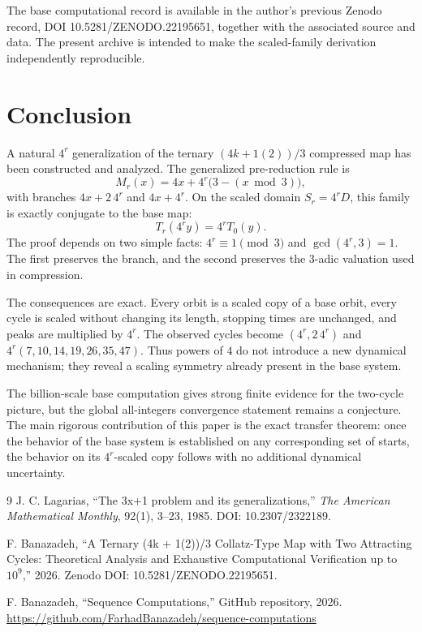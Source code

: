 \documentclass[11pt]{article}
\begin{document}
The base computational record is available in the author's previous Zenodo record, DOI 10.5281/ZENODO.22195651, together with the associated source and data. The present archive is intended to make the scaled-family derivation independently reproducible.

\section{Conclusion}
A natural $4^r$ generalization of the ternary $(4k+1(2))/3$ compressed map has been constructed and analyzed. The generalized pre-reduction rule is
\[
M_r(x)=4x+4^r\bigl(3-(x\bmod3)\bigr),
\]
with branches $4x+2\,4^r$ and $4x+4^r$. On the scaled domain $S_r=4^rD$, this family is exactly conjugate to the base map:
\[
T_r(4^ry)=4^rT_0(y).
\]
The proof depends on two simple facts: $4^r\equiv1\pmod3$ and $\gcd(4^r,3)=1$. The first preserves the branch, and the second preserves the $3$-adic valuation used in compression.

The consequences are exact. Every orbit is a scaled copy of a base orbit, every cycle is scaled without changing its length, stopping times are unchanged, and peaks are multiplied by $4^r$. The observed cycles become $(4^r,2\,4^r)$ and $4^r(7,10,14,19,26,35,47)$. Thus powers of $4$ do not introduce a new dynamical mechanism; they reveal a scaling symmetry already present in the base system.

The billion-scale base computation gives strong finite evidence for the two-cycle picture, but the global all-integers convergence statement remains a conjecture. The main rigorous contribution of this paper is the exact transfer theorem: once the behavior of the base system is established on any corresponding set of starts, the behavior on its $4^r$-scaled copy follows with no additional dynamical uncertainty.

\begin{thebibliography}{9}
J. C. Lagarias, ``The 3x+1 problem and its generalizations,'' \emph{The American Mathematical Monthly}, 92(1), 3--23, 1985. DOI: 10.2307/2322189.

F. Banazadeh, ``A Ternary (4k + 1(2))/3 Collatz-Type Map with Two Attracting Cycles: Theoretical Analysis and Exhaustive Computational Verification up to $10^9$,'' 2026. Zenodo DOI: 10.5281/ZENODO.22195651.

F. Banazadeh, ``Sequence Computations,'' GitHub repository, 2026.\\
\url{https://github.com/FarhadBanazadeh/sequence-computations}

\end{thebibliography}
\end{document}

